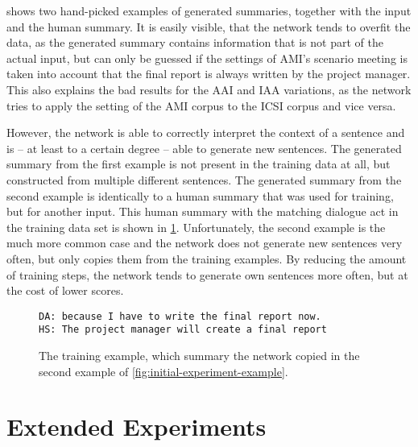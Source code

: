  shows two hand-picked examples of generated summaries, together with the input and the human summary.
It is easily visible, that the network tends to overfit the data, as the generated summary contains information that is not part of the actual input, but can only be guessed if the settings of AMI's scenario meeting is taken into account \eg that the final report is always written by the project manager.
This also explains the bad results for the AAI and IAA variations, as the network tries to apply the setting of the AMI corpus to the ICSI corpus and vice versa.

However, the network is able to correctly interpret the context of a sentence and is -- at least to a certain degree -- able to generate new sentences.
The generated summary from the first example is not present in the training data at all, but constructed from multiple different sentences.
The generated summary from the second example is identically to a human summary that was used for training, but for another input.
This human summary with the matching dialogue act in the training data set is shown in \cref{fig:initial-experiment-training-example}.
Unfortunately, the second example is the much more common case and the network does not generate new sentences very often, but only copies them from the training examples.
By reducing the amount of training steps, the network tends to generate own sentences more often, but at the cost of lower scores.

\begin{figure}[h]
\begin{lstlisting}[numbers=none]
DA: because I have to write the final report now.
HS: The project manager will create a final report
\end{lstlisting}
\caption{The training example, which summary the network copied in the second example of \cref{fig:initial-experiment-example}.}
\label{fig:initial-experiment-training-example}
\end{figure}


\section{Extended Experiments}

